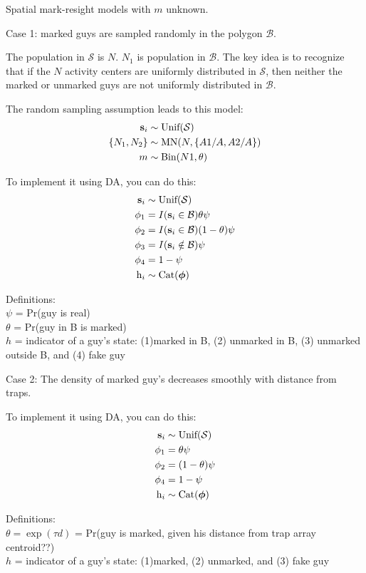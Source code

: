 \documentclass[12pt]{article}
\begin{document}
Spatial mark-resight models with $m$ unknown.

\vspace{0.5cm}



Case 1: marked guys are sampled randomly in the polygon
$\mathcal{B}$.

The population in $\mathcal{S}$ is $N$. $N_1$ is
population in $\mathcal{B}$. The key idea is to recognize that if the
$N$ activity centers are uniformly distributed in $\mathcal{S}$, then
neither the marked or unmarked guys are not uniformly distributed in
$\mathcal{B}$.

The random sampling assumption leads to this model:
\begin{align*}
  {\bf s}_i &\sim \text{Unif}(\mathcal{S}) \\
  \{N_1, N_2\} &\sim \text{MN}(N, \{A1/A, A2/A\}) \\
  m &\sim \text{Bin}(N1, \theta) \\
\end{align*}


To implement it using DA, you can do this:
\begin{align*}
  {\bf s}_i &\sim \text{Unif}(\mathcal{S}) \\
  \phi_1 &= I({\bf s}_i \in \mathcal{B}) \theta \psi \\
  \phi_2 &= I({\bf s}_i \in \mathcal{B}) (1-\theta) \psi \\
  \phi_3 &= I({\bf s}_i \notin \mathcal{B}) \psi \\
  \phi_4 &= 1 - \psi \\
  \text{h}_i &\sim \text{Cat}(\bm{\phi}) \\
\end{align*}

Definitions: \\
$\psi$ = Pr(guy is real) \\
$\theta$ = Pr(guy in B is marked) \\
$h$ = indicator of a guy's state: (1)marked in B, (2) unmarked in B,
(3) unmarked outside B, and (4) fake guy


\newpage


Case 2: The density of marked guy's decreases smoothly with distance
from traps.


To implement it using DA, you can do this:
\begin{align*}
  {\bf s}_i &\sim \text{Unif}(\mathcal{S}) \\
  \phi_1 &= \theta \psi \\
  \phi_2 &= (1-\theta) \psi \\
  \phi_4 &= 1 - \psi \\
  \text{h}_i &\sim \text{Cat}(\bm{\phi}) \\
\end{align*}


Definitions: \\
$\theta = \exp(\tau d)$ = Pr(guy is marked, given his distance from
trap array centroid??) \\
$h$ = indicator of a guy's state: (1)marked, (2) unmarked, and (3)
fake guy
\end{document}
